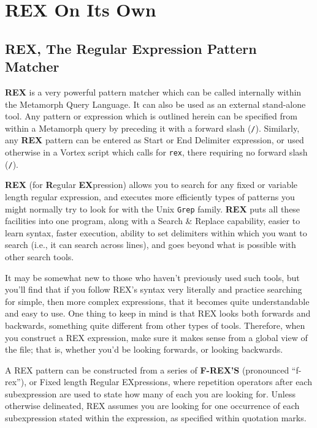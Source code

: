 \chapter{REX On Its Own}

\section{REX, The Regular Expression Pattern Matcher}

{\bf REX} is a very powerful pattern matcher which can be called
internally within the Metamorph Query Language.  It can also be used
as an external stand-alone tool.  Any pattern or expression which is
outlined herein can be specified from within a Metamorph query by
preceding it with a forward slash (\verb`/`).  Similarly, any {\bf
REX} pattern can be entered as Start or End Delimiter expression, or
used otherwise in a Vortex script which calls for \verb`rex`, there
requiring no forward slash (\verb`/`).

{\bf REX} (for {\bf R}egular {\bf EX}pression) allows you to search
for any fixed or variable length regular expression, and executes more
efficiently types of patterns you might normally try to look for with
the Unix \verb`Grep` family.  {\bf REX} puts all these facilities into
one program, along with a Search \& Replace capability, easier to
learn syntax, faster execution, ability to set delimiters within which
you want to search (i.e., it can search across lines), and goes beyond
what is possible with other search tools.

It may be somewhat new to those who haven't previously used such
tools, but you'll find that if you follow REX's syntax very literally
and practice searching for simple, then more complex expressions, that
it becomes quite understandable and easy to use.  One thing to keep in
mind is that REX looks both forwards and backwards, something quite
different from other types of tools.  Therefore, when you construct a
REX expression, make sure it makes sense from a global view of the
file; that is, whether you'd be looking forwards, or looking
backwards.

A REX pattern can be constructed from a series of {\bf F-REX'S}
(pronounced ``f-rex''), or Fixed length Regular EXpressions, where
repetition operators after each subexpression are used to state how
many of each you are looking for.  Unless otherwise delineated, REX
assumes you are looking for one occurrence of each subexpression
stated within the expression, as specified within quotation marks.

